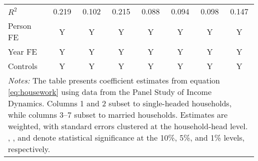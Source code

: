 {\begin{tabular}{l*{7}{c}}
\(R^{2}\)           &       0.219         &       0.102         &       0.215         &       0.088         &       0.094         &       0.098         &       0.147         \\
Person FE           &           Y         &           Y         &           Y         &           Y         &           Y         &           Y         &           Y         \\
Year FE             &           Y         &           Y         &           Y         &           Y         &           Y         &           Y         &           Y         \\
Controls            &           Y         &           Y         &           Y         &           Y         &           Y         &           Y         &           Y         \\
\bottomrule
\multicolumn{8}{p{16cm}}{\footnotesize \textit{Notes:} The table presents coefficient estimates from equation \ref{eq:housework} using data from the Panel Study of Income Dynamics. Columns 1 and 2 subset to single-headed households, while columns 3--7 subset to married households. Estimates are weighted, with standard errors clustered at the household-head level. \sym{*}, \sym{**}, and \sym{***} denote statistical significance at the 10\%, 5\%, and 1\% levels, respectively.}\\
\end{tabular}
}
